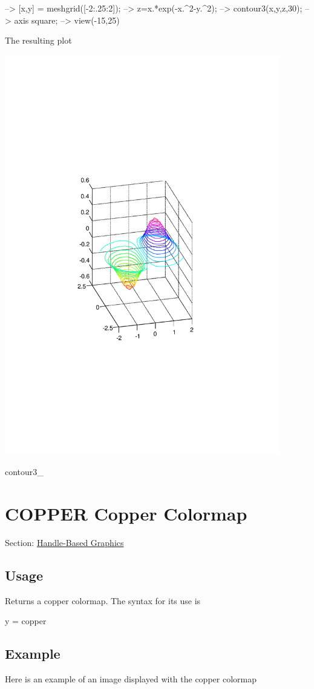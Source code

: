 \begin{DoxyVerbInclude}
--> [x,y] = meshgrid([-2:.25:2]);
--> z=x.*exp(-x.^2-y.^2);
--> contour3(x,y,z,30);
--> axis square;
--> view(-15,25)
\end{DoxyVerbInclude}


The resulting plot  
\begin{DoxyImage}
\includegraphics[width=12cm]{contour3_1}
\caption{contour3\-\_}
\end{DoxyImage}
 \hypertarget{handle_copper}{}\section{C\-O\-P\-P\-E\-R Copper Colormap}\label{handle_copper}
Section\-: \hyperlink{sec_handle}{Handle-\/\-Based Graphics} \hypertarget{vtkwidgets_vtkxyplotwidget_Usage}{}\subsection{Usage}\label{vtkwidgets_vtkxyplotwidget_Usage}
Returns a copper colormap. The syntax for its use is \begin{DoxyVerb}   y = copper
\end{DoxyVerb}
 \hypertarget{variables_struct_Example}{}\subsection{Example}\label{variables_struct_Example}
Here is an example of an image displayed with the {\ttfamily copper} colormap


